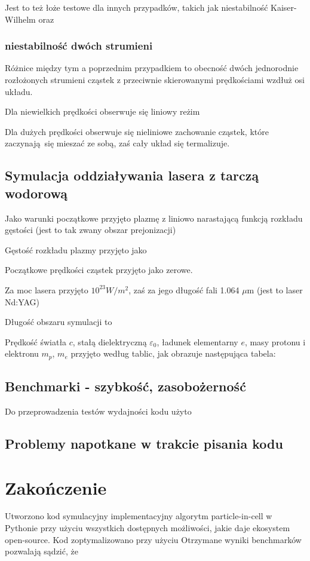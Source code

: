     Jest to też łoże testowe %
    dla innych przypadków, takich jak niestabilność Kaiser-Wilhelm %
    oraz %
    \subsubsection{niestabilność dwóch strumieni} %
    Różnice między tym a poprzednim przypadkiem to obecność dwóch jednorodnie rozłożonych strumieni cząstek
    z przeciwnie skierowanymi prędkościami wzdłuż osi układu.

    Dla niewielkich prędkości %
    obserwuje się liniowy reżim %

    Dla dużych prędkości %
     obserwuje się nieliniowe zachowanie cząstek, które zaczynają się mieszać ze sobą, zaś cały układ się termalizuje.
    \subsection{Symulacja oddziaływania lasera z tarczą wodorową}

    Jako warunki początkowe przyjęto plazmę z liniowo narastającą funkcją rozkładu gęstości (jest to tak zwany obszar prejonizacji) %

    Gęstość rozkładu plazmy przyjęto jako

    Początkowe prędkości cząstek przyjęto jako zerowe. %

    Za moc lasera przyjęto $10^{23} W/m^2$, %
    zaś za jego długość fali 1.064 $\mu$m (jest to laser Nd:YAG)

    Długość obszaru symulacji to %

    Prędkość światła $c$, stałą dielektryczną $\varepsilon_0$, ładunek elementarny $e$, masy protonu i elektronu $m_p$, $m_e$ przyjęto według tablic,
    jak obrazuje następująca tabela:


    \subsection{Benchmarki - szybkość, zasobożerność} %
    Do przeprowadzenia testów wydajności kodu użyto %
    \subsection{Problemy napotkane w trakcie pisania kodu}

    \section[Zakończenie]{Zakończenie} %
    Utworzono kod symulacyjny implementacyjny algorytm particle-in-cell w Pythonie przy użyciu wszystkich dostępnych
    możliwości, jakie daje ekosystem open-source. Kod zoptymalizowano przy użyciu %
    Otrzymane wyniki benchmarków pozwalają sądzić, że %
